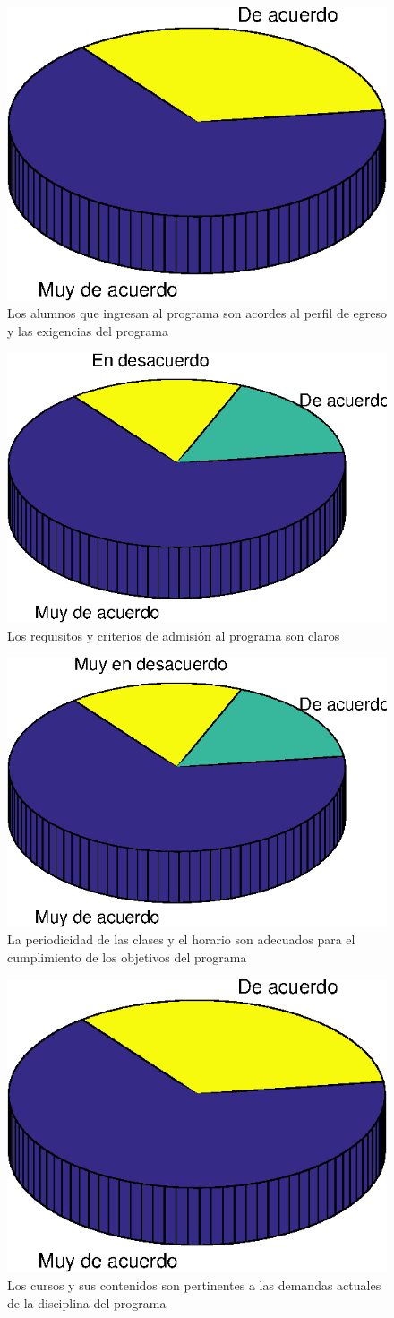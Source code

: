 \begin{figure}[ht]
\centering
\includegraphics[width=0.5\columnwidth]{./figure/graph13.eps}
\caption{Los alumnos que ingresan al programa son acordes al perfil de egreso y las exigencias  del programa}
\label{graph13}
\end{figure}

\begin{figure}[ht]
\centering
\includegraphics[width=0.5\columnwidth]{./figure/graph14.eps}
\caption{Los requisitos y criterios de admisión al programa son claros}
\label{graph14}
\end{figure}

\begin{figure}[ht]
\centering
\includegraphics[width=0.5\columnwidth]{./figure/graph15.eps}
\caption{La periodicidad de las clases y el horario son adecuados para el cumplimiento de los objetivos del programa}
\label{graph15}
\end{figure}

\begin{figure}[ht]
\centering
\includegraphics[width=0.5\columnwidth]{./figure/graph16.eps}
\caption{Los cursos y sus contenidos son pertinentes a las demandas actuales de la disciplina del programa}
\label{graph16}
\end{figure}

